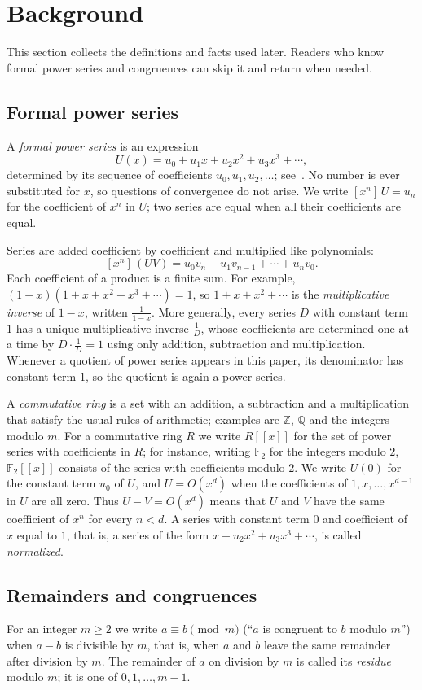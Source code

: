 \documentclass[11pt,a4paper]{article}
\theoremstyle{definition}
\theoremstyle{remark}
\newcommand{\Z}{\mathbb{Z}}
\newcommand{\Q}{\mathbb{Q}}
\newcommand{\F}{\mathbb{F}}
\newcommand{\ps}[1]{#1[[x]]}
\newcommand{\coeff}[2]{[x^{#1}]\,#2}
\begin{document}
\section{Background}\label{sec:background}
This section collects the definitions and facts used later. Readers who know formal power series and congruences can skip it and return when needed.
\subsection{Formal power series}
A \emph{formal power series} is an expression
\[
U(x)=u_0+u_1x+u_2x^2+u_3x^3+\cdots ,
\]
determined by its sequence of coefficients $u_0,u_1,u_2,\dots$; see~\cite{niven,stanley}. No number is ever
substituted for $x$, so questions of convergence do not arise. We write $\coeff{n}{U}=u_n$ for the coefficient of $x^n$ in $U$; two series are equal
when all their coefficients are equal.

Series are added coefficient by coefficient and multiplied like polynomials:
\[
\coeff{n}{(UV)}=u_0v_n+u_1v_{n-1}+\cdots+u_nv_0 .
\]
Each coefficient of a product is a finite sum. For example, $(1-x)(1+x+x^2+x^3+\cdots)=1$, so $1+x+x^2+\cdots$ is
the \emph{multiplicative inverse} of $1-x$, written $\frac{1}{1-x}$. More generally, every series $D$ with constant term
$1$ has a unique multiplicative inverse $\frac1D$, whose coefficients are determined one at a time by $D\cdot\frac1D=1$
using only addition, subtraction and multiplication. Whenever a quotient of power series appears in this paper, its
denominator has constant term $1$, so the quotient is again a power series.

A \emph{commutative ring} is a set with an addition, a subtraction and a multiplication that satisfy the usual rules
of arithmetic; examples are $\Z$, $\Q$ and the integers modulo $m$. For a commutative ring $R$ we write $\ps{R}$ for
the set of power series with coefficients in $R$; for instance, writing $\F_2$ for the integers modulo $2$, $\ps{\F_2}$
consists of the series with coefficients modulo $2$. We write
$U(0)$ for the constant term $u_0$ of $U$, and $U=O(x^d)$ when the coefficients of $1,x,\dots,x^{d-1}$ in $U$ are all
zero. Thus $U-V=O(x^d)$ means that $U$ and $V$ have the same coefficient of $x^n$ for every $n<d$. A series with
constant term $0$ and coefficient of $x$ equal to $1$, that is, a series of the form $x+u_2x^2+u_3x^3+\cdots$, is
called \emph{normalized}.

\subsection{Remainders and congruences}
For an integer $m\ge2$ we write $a\equiv b\pmod m$ (``$a$ is congruent to $b$ modulo $m$'') when $a-b$ is divisible by
$m$, that is, when $a$ and $b$ leave the same remainder after division by $m$. The remainder of $a$ on division by
$m$ is called its \emph{residue} modulo $m$; it is one of $0,1,\dots,m-1$.
\end{document}
